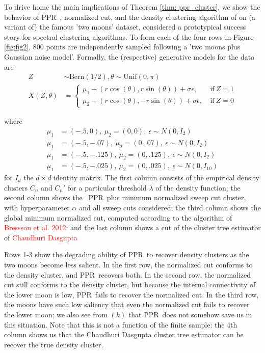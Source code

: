 \documentclass{article}
\newcommand{\1}{\mathbf{1}}
\newcommand{\pprspace}{{\sc PPR~}}
\theoremstyle{aldenthm}
\theoremstyle{aldenrmrk}
\begin{document}
To drive home the main implications of Theorem \ref{thm: ppr_cluster}, we show the behavior of \pprspace, normalized cut, and the density clustering algorithm of \citep{chaudhuri2010} on (a variant of) the famous 'two moons' dataset, considered a prototypical success story for spectral clustering algorithms. To form each of the four rows in Figure \ref{fig:fig2}, 800 points are independently sampled following a 'two moons plus Gaussian noise model'. Formally, the (respective) generative models for the data are
\begin{align}
Z & \sim \textrm{Bern}(1/2), \theta \sim \textrm{Unif}(0, \pi) \\
X(Z,\theta) & = 
\begin{cases}
\mu_1 + (r \cos(\theta), r \sin(\theta)) + \sigma \epsilon,~ & \text{if}~ Z = 1 \\
\mu_2 + (r \cos(\theta), - r \sin(\theta)) + \sigma \epsilon,~ & \text{if}~ Z = 0
\end{cases}
\end{align}

where 
\begin{align*}
\mu_1 & = (-.5, 0),~ \mu_2 = (0,0),~ \epsilon \sim N(0, I_2) \tag{row 1} \\
\mu_1 & = (-.5, -.07),~ \mu_2 = (0,.07),~ \epsilon \sim N(0, I_2) \tag{row 2} \\
\mu_1 & = (-.5, -.125),~ \mu_2 = (0,.125),~ \epsilon \sim N(0, I_2) \tag{row 3} \\
\mu_1 & = (-.5, -.025),~ \mu_2 = (0,.025),~ \epsilon \sim N(0, I_{10}) \tag{row 4}
\end{align*}
for $I_d$ the $d \times d$ identity matrix. The first column consists of the empirical density clusters $C_n$ and $C_n'$ for a particular threshold $\lambda$ of the density function; the second column shows the ~\pprspace plus minimum normalized sweep cut cluster, with hyperparameter $\alpha$ and all sweep cuts considered; the third column shows the global minimum normalized cut, computed according to the algorithm of \textcolor{red}{Bressson et al. 2012}; and the last column shows a cut of the cluster tree estimator of \textcolor{red}{Chaudhuri Dasgupta}

Rows 1-3 show the degrading ability of \pprspace to recover density clusters as the two moons become less salient. In the first row, the normalized cut conforms to the density cluster, and \pprspace recovers both. In the second row, the normalized cut still conforms to the density cluster, but because the internal connectivity of the lower moon is low, \pprspace fails to recover the normalized cut. In the third row, the moons have such low saliency that even the normalized cut fails to recover the lower moon; we also see from $(k)$ that \pprspace does not somehow save us in this situation. Note that this is not a function of the finite sample: the 4th column shows us that the Chaudhuri Dasgupta cluster tree estimator can be recover the true density cluster.
\end{document}
